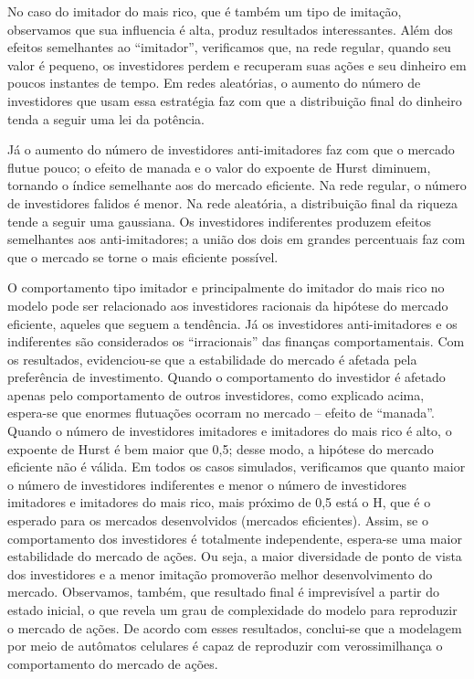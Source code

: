 \documentclass[brazil,ruledheader]{abnt}
\begin{document}
No caso do imitador do mais rico, que é também um tipo de imitação, observamos
que sua influencia é alta, produz resultados interessantes. Além dos efeitos
semelhantes ao “imitador”, verificamos que, na rede regular, quando seu valor é
pequeno, os investidores perdem e recuperam suas ações e seu dinheiro em poucos
instantes de tempo. Em redes aleatórias, o aumento do número de investidores que
usam essa estratégia faz com que a distribuição final do dinheiro tenda a seguir
uma lei da potência. 

Já o aumento do número de investidores anti-imitadores faz com que o mercado
flutue pouco; o efeito de manada e o valor do expoente de Hurst diminuem,
tornando o índice semelhante aos do mercado eficiente.  Na rede regular, o
número de investidores falidos é menor. Na rede aleatória, a distribuição final
da riqueza tende a seguir uma gaussiana.                              
Os investidores indiferentes produzem efeitos semelhantes aos anti-imitadores; a
união dos dois em grandes percentuais faz com que o mercado se torne o mais
eficiente possível.  

O comportamento tipo imitador e principalmente do imitador do mais rico no
modelo pode ser relacionado aos investidores racionais da hipótese do mercado
eficiente, aqueles que seguem a tendência. Já os investidores anti-imitadores e
os indiferentes são considerados os “irracionais” das finanças comportamentais.
Com os resultados, evidenciou-se que a estabilidade do mercado é afetada pela
preferência de investimento. Quando o comportamento do investidor é afetado
apenas pelo comportamento de outros investidores, como explicado acima,
espera-se que enormes flutuações ocorram no mercado – efeito de “manada”. Quando
o número de investidores imitadores e imitadores do mais rico é alto, o expoente
de Hurst é bem maior  que 0,5; desse modo, a hipótese  do mercado eficiente não
é válida. Em todos os casos simulados, verificamos que quanto maior o número de
investidores indiferentes e menor o número de investidores imitadores e
imitadores do mais rico, mais próximo de 0,5 está o H, que é o esperado para os
mercados desenvolvidos (mercados eficientes). Assim, se o comportamento dos
investidores é totalmente independente, espera-se uma maior estabilidade do
mercado de ações.  Ou seja, a maior diversidade de ponto de vista dos
investidores e a menor imitação promoverão melhor desenvolvimento do mercado.
Observamos, também, que resultado final é imprevisível a partir do estado
inicial, o que revela um grau de complexidade do modelo para reproduzir o
mercado de ações. De acordo com esses resultados, conclui-se que a modelagem por
meio de autômatos celulares é capaz de reproduzir com verossimilhança o
comportamento do mercado de ações.
 
\end{document}
